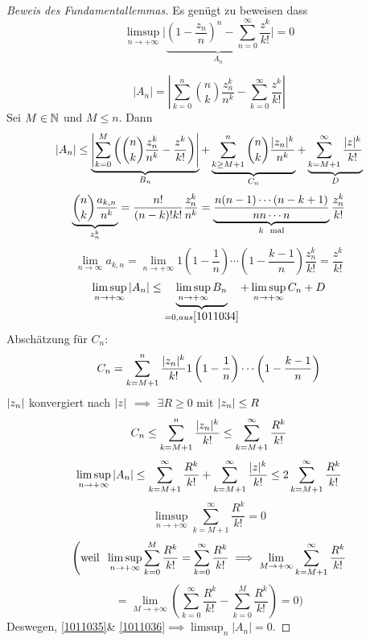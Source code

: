 \begin{proof}[Beweis des Fundamentallemmas]
Es gen\"ugt zu beweisen dass
\[\limsup_{n\to+\infty}\Bigg|\underbrace{
\left( 1-\frac{z_n}{n} \right)^n-\sum^\infty_{n=0}\frac{z^k}{k!}}_{A_n}\Bigg|=0\]

  \[|A_n|=
\left|\sum^n_{k=0}\binom{n}{k}\frac{z^k_n}{n^k}-\sum^\infty_{k=0}\frac{z^k}{k!}\right|\]
  Sei $M\in\mathbb{N}$ und $M\leq n$. Dann
  \[|A_n|\leq \underbrace{\left|\sum^M_{k=0}\left( \binom{n}{k}\frac{z^k_n}{n^k}-\frac{z^k}{k!} \right)\right|}_{B_n}+\underbrace{\sum^n_{k\geq M+1}\binom{n}{k}\frac{\mathopen| z_n \mathclose|^k}{n^k}}_{C_n}+\underbrace{\sum^\infty_{k=M+1}\frac{\mathopen| z \mathclose|^k}{k!}}_{D}\]
  \[\underbrace{\binom{n}{k}\frac{a_{k,n}}{n^k}}_{z^k_n}=\frac{n!}{(n-k)!k!}\frac{z^k_n}{n^k}=\underbrace{\frac{n(n-1)\cdots(n-k+1)}{nn\cdots n}}_{k\hspace{2mm}\text{mal}}\frac{z^k_n}{k!}\]
  \begin{equation}
    \lim_{n\to\infty}a_{k,n}=\lim_{n\to+\infty}1\left( 1-\frac{1}{n} \right)\cdots\left( 1-\frac{k-1}{n} \right)\frac{z^k_n}{k!}=\frac{z^k}{k!}
    \label{1011034}
  \end{equation}
  \[\limsup_{n\to+\infty}|A_n|\leq\underbrace{\limsup_{n\to+\infty}B_n}_{=0, aus \eqref{1011034}} + \limsup_{n\to+\infty}C_n+D\]
  Abschätzung für $C_n$:
  \[C_n=\sum^n_{k=M+1}\frac{\mathopen| z_n \mathclose|^k}{k!}1\left( 1-\frac{1}{n} \right)\cdots\left( 1-\frac{k-1}{n} \right)\]
  $\mathopen| z_n \mathclose|$ konvergiert nach $\mathopen| z \mathclose|$ $\implies$ $\exists R\geq 0$ mit $\mathopen| z_n \mathclose|\leq R$
  \[C_n \leq\sum^n_{k=M+1}\frac{\mathopen| z_n \mathclose|^k}{k!}\leq\sum^\infty_{k=M+1}\frac{R^k}{k!}\]
  \begin{equation}
    \limsup_{n\to+\infty}|A_n|\leq \sum^\infty_{k=M+1}\frac{R^k}{k!}+\sum^\infty_{k=M+1}\frac{\mathopen| z \mathclose|^k}{k!}
\leq 2 \sum^\infty_{k=M+1}\frac{R^k}{k!}
    \label{1011035}
  \end{equation}
  \begin{equation}
    \limsup_{n\to+\infty}\sum^\infty_{k=M+1}\frac{R^k}{k!}=0
    \label{1011036}
  \end{equation}
  \[\Bigg(\text{weil}\hspace{2mm}\limsup_{n\to+\infty}\sum^M_{k=0}\frac{R^k}{k!}=\sum^\infty_{k=0}\frac{R^k}{k!}\implies\lim_{M\to+\infty}\sum^\infty_{k=M+1}\frac{R^k}{k!}\]
  \[= \lim_{M\to+\infty}\left( \sum^\infty_{k=0}\frac{R^k}{k!}- \sum^M_{k=0}\frac{R^k}{k!}\right)=0\Bigg)\]
Deswegen, \eqref{1011035}\& \eqref{1011036}$\implies\limsup_n |A_n| =0$.
\end{proof}
